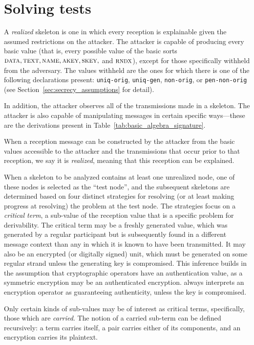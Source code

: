 \section{Solving tests}
\label{sec:tests}

 A \emph{realized} skeleton is one in which
every reception is explainable given the assumed restrictions on the
attacker.  The attacker is capable of producing every basic value
(that is, every possible value of the basic sorts
$\scap{data},\scap{text},\scap{name},\scap{akey},\scap{skey},$ and
$\scap{rndx}$), except for those specifically withheld from the
adversary.  The values withheld are the ones for which there is one of
the following declarations present: \texttt{uniq-orig},
\texttt{uniq-gen}, \texttt{non-orig}, or \texttt{pen-non-orig} (see
Section~\ref{sec:secrecy_assumptions} for detail).

In addition, the attacker observes all of the transmissions made in a
skeleton.  The attacker is also capable of manipulating messages in
certain specific ways---these are the derivations present in
Table~\ref{tab:basic_algebra_signature}.

When a reception message can be constructed by the attacker from the
basic values accessible to the attacker and the transmissions that
occur prior to that reception, we say it is \emph{realized}, meaning
that this reception can be explained.

When a skeleton to be analyzed contains at least one unrealized node,
one of these nodes is selected as the ``test node'', and the
subsequent skeletons are determined based on four distinct strategies
for resolving (or at least making progress at resolving) the problem
at the test node.  The strategies focus on a \emph{critical term}, a
sub-value of the reception value that is a specific problem for
derivability.  The critical term may be a freshly generated value,
which was generated by a regular participant but is subsequently found
in a different message context than any in which it is known to have
been transmitted.  It may also be an encrypted (or digitally signed)
unit, which must be generated on some regular strand unless the
generating key is compromised.  This inference builds in the
assumption that cryptographic operators have an authentication value,
as a symmetric encryption may be an authenticated encryption.  {\cpsa}
always interprets an encryption operator as guaranteeing authenticity,
unless the key is compromised.

Only certain kinds of sub-values may be of interest as critical terms,
specifically, those which are \emph{carried}.
The notion of a carried sub-term can be defined recursively: a term
carries itself, a pair carries either of its components, and an
encryption carries its plaintext.

